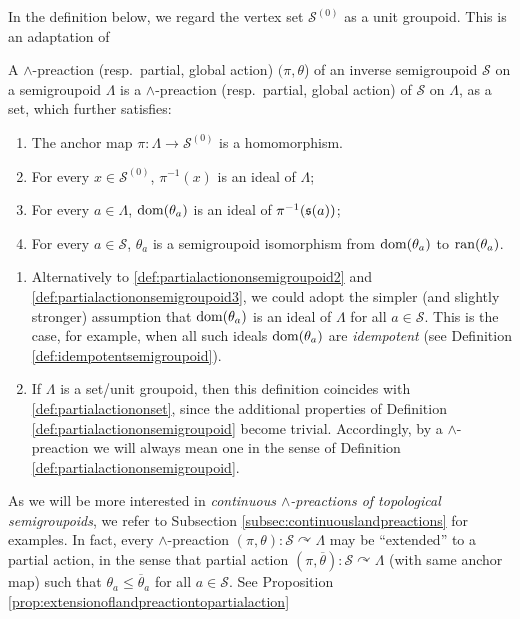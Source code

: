 In the definition below, we regard the vertex set $\mathcal{S}^{(0)}$ as a unit groupoid. This is an adaptation of \cite[p. 3660]{MR2982887}

\begin{definition}\label{def:partialactiononsemigroupoid}
    A $\land$-preaction (resp.\ partial, global action) $(\pi,\theta$) of an inverse semigroupoid $\mathcal{S}$ on a semigroupoid $\Lambda$ is a $\land$-preaction (resp.\ partial, global action) of $\mathcal{S}$ on $\Lambda$, as a set, which further satisfies:
    \begin{enumerate}[label=(\roman*)]
        \item\label{def:partialactiononsemigroupoid1} The anchor map $\pi\colon\Lambda\to\mathcal{S}^{(0)}$ is a homomorphism.
        \item\label{def:partialactiononsemigroupoid2} For every $x\in\mathcal{S}^{(0)}$, $\pi^{-1}(x)$ is an ideal of $\Lambda$;
        \item\label{def:partialactiononsemigroupoid3} For every $a\in\Lambda$, $\operatorname{dom}(\theta_a)$ is an ideal of $\pi^{-1}(\operatorname{\mathfrak{s}}(a))$;
        \item\label{def:partialactiononsemigroupoid4} For every $a\in\mathcal{S}$, $\theta_a$ is a semigroupoid isomorphism from $\operatorname{dom}(\theta_a)$ to $\operatorname{ran}(\theta_a)$.
    \end{enumerate}
\end{definition}

\begin{remark}
\begin{enumerate}
    \item Alternatively to \ref{def:partialactiononsemigroupoid2} and \ref{def:partialactiononsemigroupoid3}, we could adopt the simpler (and slightly stronger) assumption that $\operatorname{dom}(\theta_a)$ is an ideal of $\Lambda$ for all $a\in\mathcal{S}$. This is the case, for example, when all such ideals $\operatorname{dom}(\theta_a)$ are \emph{idempotent} (see Definition \ref{def:idempotentsemigroupoid}).
    \item If $\Lambda$ is a set/unit groupoid, then this definition coincides with \ref{def:partialactiononset}, since the additional properties of Definition \ref{def:partialactiononsemigroupoid} become trivial. Accordingly, by a $\land$-preaction we will always mean one in the sense of Definition \ref{def:partialactiononsemigroupoid}.
\end{enumerate}
\end{remark}

As we will be more interested in \emph{continuous $\land$-preactions of topological semigroupoids}, we refer to Subsection \ref{subsec:continuouslandpreactions} for examples. In fact, every $\land$-preaction $(\pi,\theta)\colon\mathcal{S}\curvearrowright\Lambda$ may be ``extended'' to a partial action, in the sense that partial action $(\pi,\overline{\theta})\colon\mathcal{S}\curvearrowright\Lambda$ (with same anchor map) such that $\theta_a\leq\overline{\theta}_a$ for all $a\in\mathcal{S}$. See Proposition \ref{prop:extensionoflandpreactiontopartialaction}

